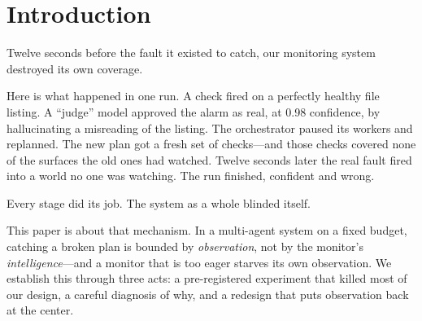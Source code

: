 \documentclass[acmsmall,screen]{acmart}
\begin{document}
\begin{abstract}
Finally, we asked whether the coupling is one model family's quirk. In a
\emph{separately and later} pre-registered live study, we swapped a different
vendor's model (GPT-5.5) into the check-writing step through a frozen seam. It is
a cheaper, higher-quality writer---yet the frozen bar failed a third time.
Offline the escape looked open (detection is flat as we cut the model's
reasoning); live it closed, because the cost lever that could clear the bar is
\emph{checklist coverage}, and coverage is what does the catching. Shortening the
checks to save money drops exactly the faults that need a specific probe---across
three seeds the shortest checklist catches strictly fewer faults than the full one
on every seed, and detection also \emph{destabilizes} (from 4--5 of 5 caught at
full to 1--4 at the tightest cap)---while overhead never reaches 12\%. The coupling
holds on a second model family, through a new mechanism.
\end{abstract}


\maketitle

\section{Introduction}
Twelve seconds before the fault it existed to catch, our monitoring system
destroyed its own coverage.

Here is what happened in one run. A check fired on a perfectly healthy file
listing. A ``judge'' model approved the alarm as real, at 0.98 confidence, by
hallucinating a misreading of the listing. The orchestrator paused its workers
and replanned. The new plan got a fresh set of checks---and those checks
covered none of the surfaces the old ones had watched. Twelve seconds later the
real fault fired into a world no one was watching. The run finished, confident
and wrong.

Every stage did its job. The system as a whole blinded itself.

This paper is about that mechanism. In a multi-agent system on a fixed budget,
catching a broken plan is bounded by \emph{observation}, not by the monitor's
\emph{intelligence}---and a monitor that is too eager starves its own
observation. We establish this through three acts: a pre-registered experiment
that killed most of our design, a careful diagnosis of why, and a redesign that
puts observation back at the center.
\end{document}
